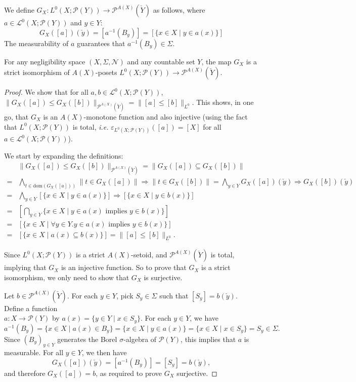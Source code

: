 \documentclass{lmcs}
\newcommand{\dom}{\ensuremath{\mathrm{dom}}}
\newcommand{\Ell}{\mathcal{L}}
\newcommand{\En}{\mathcal{N}}
\newcommand{\powerset}{\ensuremath{\mathcal{P}}}
\newcommand{\axpowerset}{\powerset^{A(X)}}
\newcommand{\inn}{\varepsilon}
\begin{document}
We define $G_X : L^0(X;\powerset(Y)) \rightarrow \axpowerset(\check{Y})$ as follows, where $a \in \Ell^0(X;\powerset(Y))$ and $y \in Y$:
\begin{equation}\label{GXDefEqn}	
	G_X([a])(\check{y}) = [a^{-1}(B_y)] = [\{x \in X \mid y \in a(x) \}]
\end{equation}
The measurability of $a$ guarantees that $a^{-1}(B_y) \in \Sigma$. 

\begin{prop}
\label{GXBijectionProp}
For any negligibility space $(X,\Sigma,\En)$ and any countable set $Y$, the map $G_X$ is a strict isomorphism of $A(X)$-posets $L^0(X;\powerset(Y)) \rightarrow \axpowerset(\check{Y})$.
\end{prop}
\begin{proof}
We show that for all $a,b \in \Ell^0(X;\powerset(Y))$, $\|G_X([a]) \leq G_X([b])\|_{\axpowerset(\check{Y})} = \| [a] \leq [b] \|_{L^0}$. This shows, in one go, that $G_X$ is an $A(X)$-monotone function and also injective (using the fact that $L^0(X;\powerset(Y))$ is total, \emph{i.e.} $\inn_{L^0(X;\powerset(Y))}([a]) = [X]$ for all $a \in \Ell^0(X;\powerset(Y))$). 
	
We start by expanding the definitions:
\begin{align*}
& \| G_X([a]) \leq G_X([b]) \|_{\axpowerset(\check{Y})} = \| G_X([a]) \subseteq G_X([b]) \| \\
={} & \bigwedge_{t \in \dom(G_X([a]))} \| t \in G_X([a]) \| \Rightarrow \| t \in G_X([b]) \| = \bigwedge_{y \in Y} G_X([a])(\check{y}) \Rightarrow G_X([b])(\check{y}) \\
={} & \bigwedge_{y \in Y} [\{ x \in X \mid y \in a(x)\}] \Rightarrow [\{x \in X \mid y \in b(x) \}] \\
 ={} & \left[\bigcap_{y \in Y} \{ x \in X \mid y \in a(x) \text{ implies } y \in b(x) \}\right] \\
={} & [\{ x \in X \mid \forall y \in Y. y \in a(x) \text{ implies } y \in b(x) \}] \\
 ={} & [\{ x \in X \mid a(x) \subseteq b(x) \}] = \| [a] \leq [b] \|_{L^0}.
\end{align*}
	
Since $L^0(X;\powerset(Y))$ is a strict $A(X)$-setoid, and $\axpowerset(\check{Y})$ is total, implying that $G_X$ is an injective function. So to prove that $G_X$ is a strict isomorphism, we only need to show that $G_X$ is surjective.
	
Let $b \in \axpowerset(\check{Y})$. For each $y \in Y$, pick $S_y \in \Sigma$ such that $[S_y] = b(\check{y})$. Define a function \\$a : X \rightarrow \powerset(Y)$ by $a(x) = \{ y \in Y \mid x \in S_y \}$. For each $y \in Y$, we have
\[
a^{-1}(B_y) = \{ x \in X \mid a(x) \in B_y \} = \{ x \in X \mid y \in a(x) \} = \{ x \in X \mid x \in S_y \} = S_y \in \Sigma.
\]
Since $(B_y)_{y \in Y}$ generates the Borel $\sigma$-algebra of $\powerset(Y)$, this implies that $a$ is measurable. For all $y \in Y$, we then have
\[
G_X([a])(\check{y}) = [a^{-1}(B_y)] = [S_y] = b(\check{y}),
\]
and therefore $G_X([a]) = b$, as required to prove $G_X$ surjective. 
\end{proof}
\end{document}
